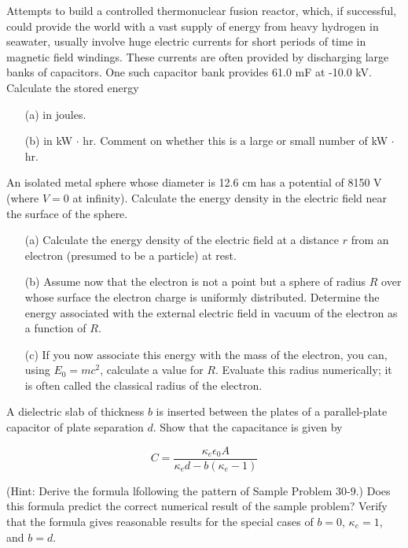 \documentclass[11pt,letterpaper,boxed]{pset}
\begin{document}
    \begin{problem} [E30.22]
    Attempts to build a controlled thermonuclear fusion reactor, which, if successful, could provide the world with a vast supply of energy from heavy hydrogen in seawater, usually involve huge electric currents for short periods of time in magnetic field windings. These currents are often provided by discharging large banks of capacitors. One such capacitor bank provides 61.0 mF at -10.0 kV. Calculate the stored energy
    
    \begin{itemize}
        \item [(a)] in joules.
        \item [(b)] in kW $\cdot$ hr. Comment on whether this is a large or small number of kW $\cdot$ hr.
    \end{itemize}
    \end{problem}
    \newpage
    
    \begin{problem} [*E30.25]
    An isolated metal sphere whose diameter is 12.6 cm has a potential of 8150 V (where $V=0$ at infinity). Calculate the energy density in the electric field near the surface of the sphere.
    \end{problem}
    \newpage
    
    \begin{problem} [P30.13]
    \begin{itemize}
        \item [(a)] Calculate the energy density of the electric field at a distance $r$ from an electron (presumed to be a particle) at rest.
        \item [(b)] Assume now that the electron is not a point but a sphere of radius $R$ over whose surface the electron charge is uniformly distributed. Determine the energy associated with the external electric field in vacuum of the electron as a function of $R$.
        \item [(c)] If you now associate this energy with the mass of the electron, you can, using $E_0=mc^2$, calculate a value for $R$. Evaluate this radius numerically; it is often called the classical radius of the electron.
    \end{itemize}
    \end{problem}
    \newpage
    
    \begin{problem} [P30.24]
    A dielectric slab of thickness $b$ is inserted between the plates of a parallel-plate capacitor of plate separation $d$. Show that the capacitance is given by
    
    \[C = \frac{\kappa_e\epsilon_0A}{\kappa_ed-b(\kappa_e-1)}\]
    
    (Hint: Derive the formula lfollowing the pattern of Sample Problem 30-9.) Does this formula predict the correct numerical result of the sample problem? Verify that the formula gives reasonable results for the special cases of $b=0$, $\kappa_e=1$, and $b=d$.
    \end{problem}
    \newpage
\end{document}
